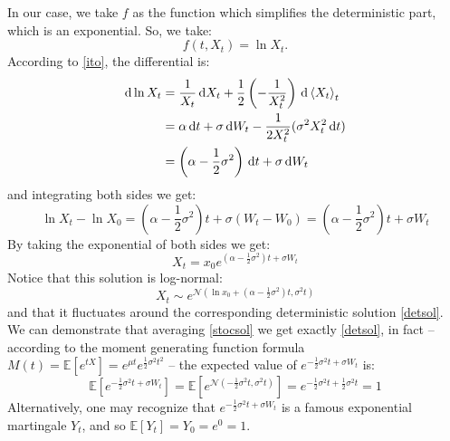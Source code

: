In our case, we take $f$ as the function which simplifies the deterministic part, which is an exponential. So, we take:
\begin{equation}
    f(t,X_t) = \ln X_t.
\end{equation}
According to \eqref{ito}, the differential is:
\begin{align}
    \notag \dd\ln{X_t} &= \dfrac{1}{X_t}\,\dd X_t + \dfrac{1}{2}\left(-\dfrac{1}{X_t^2}\right)\,\dd \expval{X_t}_t \\
    &=
    \notag \alpha\,\dd t + \sigma\,\dd W_t - \dfrac{1}{2X_t^2}(\sigma^2X_t^2\,\dd t)\\
    &=
    \left(\alpha-\dfrac{1}{2}\sigma^2\right)\,\dd t + \sigma\,\dd W_t
\end{align}
and integrating both sides we get:
\begin{equation}
    \ln X_t - \ln X_0 = \left(\alpha-\dfrac{1}{2}\sigma^2\right)t + \sigma(W_t-W_0) = \left(\alpha-\dfrac{1}{2}\sigma^2\right)t + \sigma W_t
\end{equation}
By taking the exponential of both sides we get:
\begin{equation}\label{stocsol}
    X_t = x_0e^{\left(\alpha-\frac{1}{2}\sigma^2\right)t + \sigma W_t}
\end{equation}
Notice that this solution is log-normal:
\begin{equation*}
    X_t \sim e^{\mathcal{N}\left(\ln x_0 + \left(\alpha-\frac{1}{2}\sigma^2\right)t, \sigma^2 t\right)}
\end{equation*}
and that it fluctuates around the corresponding deterministic solution \eqref{detsol}. We can demonstrate that averaging \eqref{stocsol} we get exactly \eqref{detsol}, in fact -- according to the moment generating function formula ${M(t)=\mathbb{E}[e^{tX}]=e^{\mu t}e^{{\frac {1}{2}}\sigma^{2}t^{2}}}$ -- the expected value of $e^{-\frac{1}{2}\sigma^2 t + \sigma W_t}$ is:
\begin{equation*}
    \mathbb{E}\left[e^{-\frac{1}{2}\sigma^2 t + \sigma W_t}\right] = \mathbb{E}\left[
    e^{\mathcal{N}\left(-\frac{1}{2}\sigma^2 t, \sigma^2 t\right)}\right] = e^{-\frac{1}{2}\sigma^2 t + \frac{1}{2}\sigma^2 t} = 1
\end{equation*}
Alternatively, one may recognize that $e^{-\frac{1}{2}\sigma^2 t + \sigma W_t}$ is a famous exponential martingale $Y_t$, and so $\mathbb{E}[Y_t]=Y_0=e^0 = 1$.

